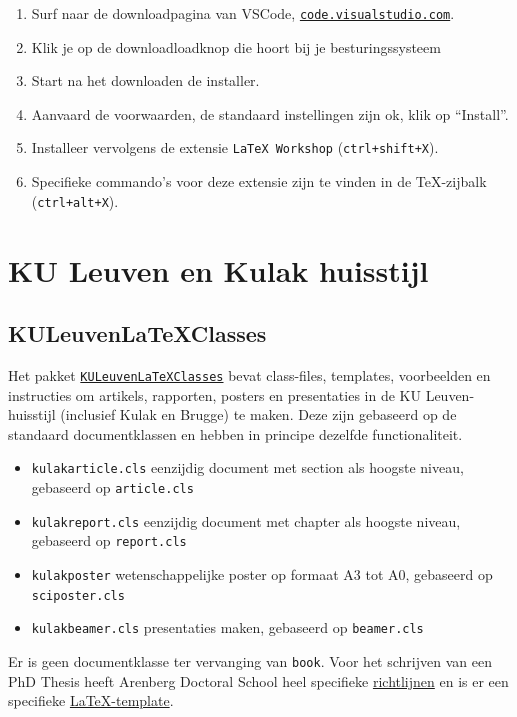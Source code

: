 \documentclass[kulak]{kulakarticle} %
\begin{document}
\begin{enumerate}
	\item Surf naar de downloadpagina van VSCode, \href{code.visualstudio.com/}{\texttt{code.visualstudio.com}}.
	\item Klik je op de downloadloadknop die hoort bij je besturingssysteem
	\item Start na het downloaden de installer.
	\item Aanvaard de voorwaarden, de standaard instellingen zijn ok, klik op ``Install''.
	\item Installeer vervolgens de extensie \texttt{LaTeX Workshop} (\texttt{ctrl+shift+X}).
	\item Specifieke commando's voor deze extensie zijn te vinden in de \TeX-zijbalk (\texttt{ctrl+alt+X}).
\end{enumerate}

\section{KU Leuven en Kulak huisstijl}
\label{sec:huisstijl}
\subsection{KULeuvenLaTeXClasses}
Het pakket \href{https://github.com/srebry/KULeuvenLaTeXClasses}{\texttt{KULeuvenLaTeXClasses}} bevat class-files, templates, voorbeelden en instructies om artikels, rapporten, posters en presentaties in de KU Leuven-huisstijl (inclusief Kulak en Brugge) te maken. Deze zijn gebaseerd op de standaard documentklassen en hebben in principe dezelfde functionaliteit.
\begin{itemize}
	\item \texttt{kulakarticle.cls} eenzijdig document met section als hoogste niveau, gebaseerd op \texttt{article.cls}
	\item \texttt{kulakreport.cls} eenzijdig document met chapter als hoogste niveau, gebaseerd op \texttt{report.cls}
	\item \texttt{kulakposter} wetenschappelijke poster op formaat A3 tot A0, gebaseerd op \texttt{sciposter.cls}
	\item \texttt{kulakbeamer.cls} presentaties maken, gebaseerd op \texttt{beamer.cls}
\end{itemize}

Er is geen documentklasse ter vervanging van \texttt{book}. Voor het schrijven van een PhD Thesis heeft Arenberg Doctoral School heel specifieke \href{https://set.kuleuven.be/intranet-associatie/ADS/guidelines_PhDthesis.htm}{richtlijnen} en is er een specifieke \href{https://people.cs.kuleuven.be/~wannes.meert/adsphd/}{\LaTeX-template}.
\end{document}
